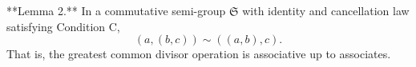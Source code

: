 **Lemma 2.** In a commutative semi-group $\mathfrak{S}$ with identity and cancellation law satisfying Condition C,
$$(a, (b, c)) \sim ((a, b), c).$$
That is, the greatest common divisor operation is associative up to associates.
